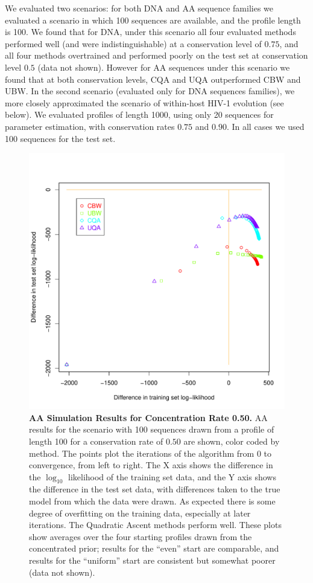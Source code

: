 \documentclass[preprint,12pt,authoryear]{elsarticle}
\begin{document}
We evaluated two scenarios: for both DNA and AA sequence families we evaluated a scenario in which 100 sequences are available, and the profile length is 100.  We found that for DNA, under this scenario all four evaluated methods performed well (and were indistinguishable) at a conservation level of $0.75$, and all four methods overtrained and performed poorly on the test set at conservation level $0.5$ (data not shown).  However for AA sequences under this scenario we found that at both conservation levels, CQA and UQA outperformed CBW and UBW.  In the second scenario (evaluated only for DNA sequences families), we more closely approximated the scenario of within-host HIV-1 evolution (see below). We evaluated profiles of length 1000, using only 20 sequences for parameter estimation, with conservation rates $0.75$ and $0.90$.  In all cases we used 100 sequences for the test set.

\begin{figure}[htp]
\centering
\includegraphics[scale=.85]{AA_priorstart_results_50.pdf}
\caption{\textbf{AA Simulation Results for Concentration Rate 0.50.}  AA results for the scenario with 100 sequences drawn from a profile of length 100 for a conservation rate of $0.50$ are shown, color coded by method.  The points plot the iterations of the algorithm from 0 to convergence, from left to right.  The X axis shows the difference in the $\log_{10}$ likelihood of the training set data, and the Y axis shows the difference in the test set data, with differences taken to the true model from which the data were drawn.  As expected there is some degree of overfitting on the training data, especially at later iterations. The Quadratic Ascent methods perform well.  These plots show averages over the four starting profiles drawn from the concentrated prior; results for the ``even'' start are comparable, and results for the ``uniform'' start are consistent but somewhat poorer (data not shown).}
\label{fig:AA_priorstart_results_50}
\end{figure}
\end{document}
